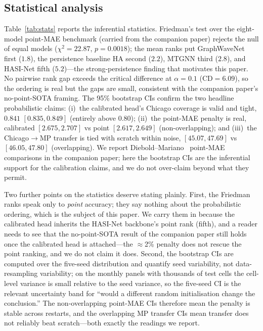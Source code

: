 \documentclass[11pt,conference]{IEEEtran}
\begin{document}
\subsection{Statistical analysis}\label{sec:stats}
Table~\ref{tab:stats} reports the inferential statistics. Friedman's test over
the eight-model point-MAE benchmark (carried from the companion paper) rejects
the null of equal models ($\chi^2{=}22.87$, $p{=}0.0018$); the mean ranks put
GraphWaveNet first ($1.8$), the persistence baseline HA second ($2.2$), MTGNN
third ($2.8$), and HASI-Net fifth ($5.2$)---the strong-persistence finding that
motivates this paper. No pairwise rank gap exceeds the critical difference at
$\alpha{=}0.1$ ($\mathrm{CD}{=}6.09$), so the ordering is real but the gaps are
small, consistent with the companion paper's no-point-SOTA framing. The 95\%
bootstrap CIs confirm the two headline probabilistic claims: (i)~the calibrated
head's Chicago coverage is valid and tight, $0.841$ $[0.835,0.849]$ (entirely above
0.80); (ii)~the point-MAE penalty is real, calibrated $[2.675,2.707]$ vs point
$[2.617,2.649]$ (non-overlapping); and (iii)~the Chicago$\to$MP transfer is tied
with scratch within noise, $[45.07,47.69]$ vs $[46.05,47.80]$ (overlapping). We
report Diebold--Mariano~\cite{diebold1995comparing} point-MAE comparisons in the
companion paper; here the bootstrap CIs are the inferential support for the
calibration claims, and we do not over-claim beyond what they permit.

Two further points on the statistics deserve stating plainly. First, the
Friedman ranks speak only to \emph{point} accuracy; they say nothing about the
probabilistic ordering, which is the subject of this paper. We carry them in
because the calibrated head inherits the HASI-Net backbone's point rank
(fifth), and a reader needs to see that the no-point-SOTA result of the
companion paper still holds once the calibrated head is attached---the
$\approx$2\% penalty does not rescue the point ranking, and we do not claim it
does. Second, the bootstrap CIs are computed over the five-seed distribution and
quantify seed variability, not data-resampling variability; on the monthly
panels with thousands of test cells the cell-level variance is small relative to
the seed variance, so the five-seed CI is the relevant uncertainty band for
``would a different random initialisation change the conclusion.'' The
non-overlapping point-MAE CIs therefore mean the penalty is stable across
restarts, and the overlapping MP transfer CIs mean transfer does not reliably
beat scratch---both exactly the readings we report.
\end{document}
